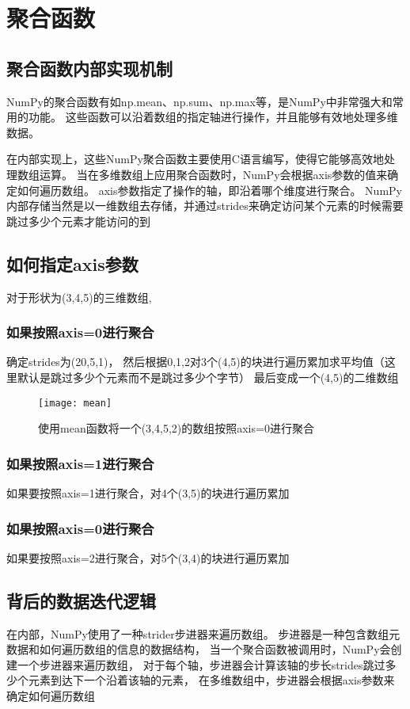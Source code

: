 \documentclass[10pt]{article}
\begin{document}
	
	\section{聚合函数}
	\subsection{聚合函数内部实现机制}
	NumPy的聚合函数有如np.mean、np.sum、np.max等，是NumPy中非常强大和常用的功能。
	这些函数可以沿着数组的指定轴进行操作，并且能够有效地处理多维数据。\par
	在内部实现上，这些NumPy聚合函数主要使用C语言编写，使得它能够高效地处理数组运算。
	当在多维数组上应用聚合函数时，NumPy会根据axis参数的值来确定如何遍历数组。
	axis参数指定了操作的轴，即沿着哪个维度进行聚合。
	NumPy内部存储当然是以一维数组去存储，并通过strides来确定访问某个元素的时候需要跳过多少个元素才能访问的到
	\subsection{如何指定axis参数}
	对于形状为(3,4,5)的三维数组,
	\subsubsection{如果按照axis=0进行聚合}
	确定strides为(20,5,1)，
	然后根据0,1,2对3个(4,5)的块进行遍历累加求平均值（这里默认是跳过多少个元素而不是跳过多少个字节）
	最后变成一个(4,5)的二维数组
	\begin{figure}[H]
		\centering
		\texttt{[image: mean]}
		\caption{使用mean函数将一个(3,4,5,2)的数组按照axis=0进行聚合}
	\end{figure}
	\subsubsection{如果按照axis=1进行聚合}
	如果要按照axis=1进行聚合，对4个(3,5)的块进行遍历累加
	\subsubsection{如果按照axis=0进行聚合}
	如果要按照axis=2进行聚合，对5个(3,4)的块进行遍历累加
	\subsection{背后的数据迭代逻辑}
	在内部，NumPy使用了一种strider步进器来遍历数组。
	步进器是一种包含数组元数据和如何遍历数组的信息的数据结构，
	当一个聚合函数被调用时，NumPy会创建一个步进器来遍历数组，
	对于每个轴，步进器会计算该轴的步长strides跳过多少个元素到达下一个沿着该轴的元素，
	在多维数组中，步进器会根据axis参数来确定如何遍历数组
	
\end{document}
